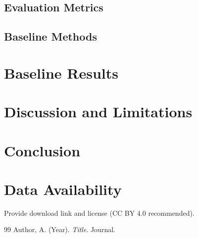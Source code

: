 \documentclass[12pt,a4paper]{article}
\begin{document}
\subsection{Evaluation Metrics}
\subsection{Baseline Methods}

\section{Baseline Results}
\section{Discussion and Limitations}
\section{Conclusion}
\section*{Data Availability}
Provide download link and license (CC BY 4.0 recommended).


\begin{thebibliography}{99}
 Author, A. (Year). \textit{Title}. Journal.
\end{thebibliography}
\end{document}
